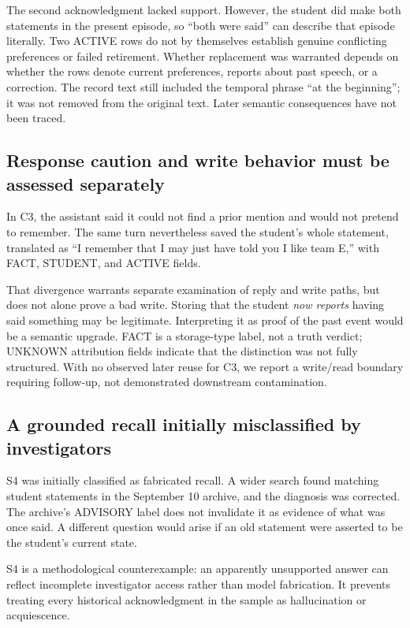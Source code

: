 \documentclass[11pt,a4paper]{article}
\begin{document}
The second acknowledgment lacked support. However, the student did make both statements in the present episode, so ``both were said'' can describe that episode literally. Two ACTIVE rows do not by themselves establish genuine conflicting preferences or failed retirement. Whether replacement was warranted depends on whether the rows denote current preferences, reports about past speech, or a correction. The record text still included the temporal phrase ``at the beginning''; it was not removed from the original text. Later semantic consequences have not been traced.

\subsection{Response caution and write behavior must be assessed separately}
In C3, the assistant said it could not find a prior mention and would not pretend to remember. The same turn nevertheless saved the student's whole statement, translated as ``I remember that I may just have told you I like team E,'' with FACT, STUDENT, and ACTIVE fields.

That divergence warrants separate examination of reply and write paths, but does not alone prove a bad write. Storing that the student \emph{now reports} having said something may be legitimate. Interpreting it as proof of the past event would be a semantic upgrade. FACT is a storage-type label, not a truth verdict; UNKNOWN attribution fields indicate that the distinction was not fully structured. With no observed later reuse for C3, we report a write/read boundary requiring follow-up, not demonstrated downstream contamination.

\subsection{A grounded recall initially misclassified by investigators}
S4 was initially classified as fabricated recall. A wider search found matching student statements in the September 10 archive, and the diagnosis was corrected. The archive's ADVISORY label does not invalidate it as evidence of what was once said. A different question would arise if an old statement were asserted to be the student's current state.

S4 is a methodological counterexample: an apparently unsupported answer can reflect incomplete investigator access rather than model fabrication. It prevents treating every historical acknowledgment in the sample as hallucination or acquiescence.
\end{document}
